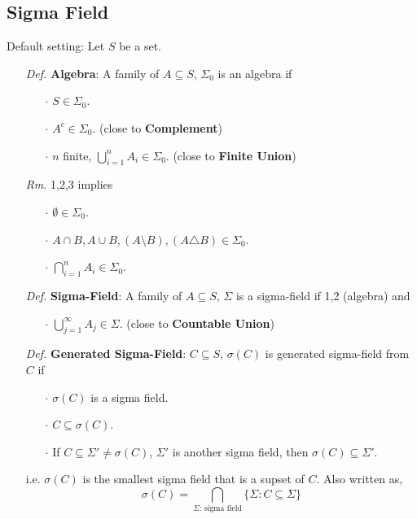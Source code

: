 \documentclass[a4paper,12pt,twoside]{book}
\begin{document}
\subsection{Sigma Field}
Default setting: Let $S$ be a set.
\begin{itemize}
	\item[\textit{Def.}] \textbf{Algebra}: A family of $A \subseteq S$, $\Sigma_0$ is an algebra if
	\begin{itemize}
		\item[$\cdot$] $S \in \Sigma_0$.
		\item[$\cdot$] $A^c \in \Sigma_0$. (close to \textbf{Complement})
		\item[$\cdot$] $n$ finite, $\bigcup_{i=1}^n A_i \in \Sigma_0$. (close to \textbf{Finite Union})
	\end{itemize}

	\item[\textit{Rm.}] 1,2,3 implies
	\begin{itemize}
		\item[$\cdot$] $\emptyset \in \Sigma_0$.
		\item[$\cdot$] $A \cap B, A\cup B, (A\setminus B), (A\triangle B) \in \Sigma_0$.
		\item[$\cdot$] $\bigcap_{i=1}^n A_i \in \Sigma_0$.
	\end{itemize}

	\item[\textit{Def.}] \textbf{Sigma-Field}: A family of $A \subseteq S$, $\Sigma$ is a sigma-field if 1,2 (algebra) and
	\begin{itemize}
		\item[$\cdot$] $\bigcup_{j=1}^{\infty} A_j \in \Sigma$. (close to \textbf{Countable Union})
	\end{itemize}

	\item[\textit{Def.}] \textbf{Generated Sigma-Field}: $C \subseteq S$, $\sigma(C)$ is generated sigma-field from $C$ if
	\begin{itemize}
		\item[$\cdot$] $\sigma(C)$ is a sigma field.
		\item[$\cdot$] $C \subseteq \sigma(C)$.
		\item[$\cdot$] If $C \subseteq \Sigma'\ne \sigma(C)$, $\Sigma'$ is another sigma field, then $\sigma(C) \subseteq \Sigma'$.
	\end{itemize}
	i.e. $\sigma(C)$ is the smallest sigma field that is a supset of $C$. Also written as,
	\begin{equation}
		\sigma(C)=\bigcap_{\Sigma \text{: sigma field}}\{\Sigma: C \subseteq \Sigma\}
	\end{equation}


\end{itemize}
\end{document}
